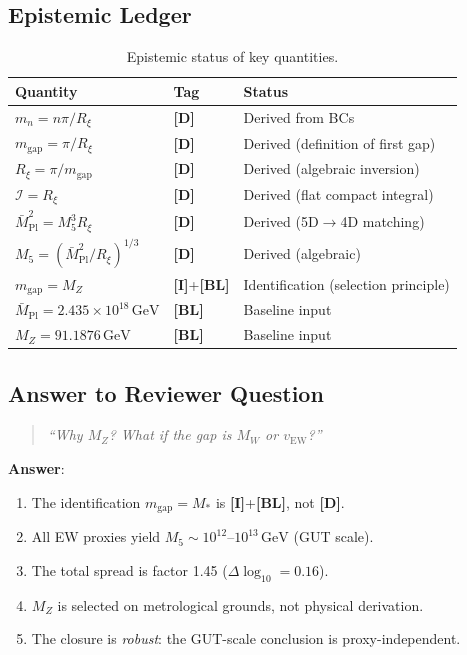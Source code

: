 \documentclass[11pt,a4paper]{article}
\newcommand{\Mpl}{\bar{M}_{\mathrm{Pl}}}
\newcommand{\Mfive}{M_5}
\newcommand{\Rxi}{R_\xi}
\newcommand{\mgap}{m_{\mathrm{gap}}}
\newcommand{\MZ}{M_Z}
\newcommand{\MW}{M_W}
\newcommand{\vEW}{v_{\mathrm{EW}}}
\newcommand{\Mstar}{M_*}
\newcommand{\GeV}{\,\mathrm{GeV}}
\newcommand{\tagD}{\textbf{[D]}}
\newcommand{\tagI}{\textbf{[I]}}
\newcommand{\tagBL}{\textbf{[BL]}}
\theoremstyle{definition}
\theoremstyle{plain}
\theoremstyle{remark}
\begin{document}
\subsection{Epistemic Ledger}

\begin{table}[htbp]
\centering
\caption{Epistemic status of key quantities.}
\label{tab:epistemic}
\begin{tabular}{@{}lll@{}}
\toprule
Quantity & Tag & Status \\
\midrule
$m_n = n\pi/\Rxi$ & \tagD{} & Derived from BCs \\
$\mgap = \pi/\Rxi$ & \tagD{} & Derived (definition of first gap) \\
$\Rxi = \pi/\mgap$ & \tagD{} & Derived (algebraic inversion) \\
$\mathcal{I} = \Rxi$ & \tagD{} & Derived (flat compact integral) \\
$\Mpl^2 = \Mfive^3 \Rxi$ & \tagD{} & Derived (5D$\to$4D matching) \\
$\Mfive = (\Mpl^2/\Rxi)^{1/3}$ & \tagD{} & Derived (algebraic) \\
\midrule
$\mgap = \MZ$ & \tagI{}+\tagBL{} & Identification (selection principle) \\
$\Mpl = 2.435 \times 10^{18}\GeV$ & \tagBL{} & Baseline input \\
$\MZ = 91.1876\GeV$ & \tagBL{} & Baseline input \\
\bottomrule
\end{tabular}
\end{table}

\subsection{Answer to Reviewer Question}

\begin{quote}
\emph{``Why $\MZ$? What if the gap is $\MW$ or $\vEW$?''}
\end{quote}

\textbf{Answer}:
\begin{enumerate}
\item The identification $\mgap = \Mstar$ is \tagI{}+\tagBL{}, not \tagD{}.
\item All EW proxies yield $\Mfive \sim 10^{12}\text{--}10^{13}\GeV$ (GUT scale).
\item The total spread is factor 1.45 ($\Delta\log_{10} = 0.16$).
\item $\MZ$ is selected on metrological grounds, not physical derivation.
\item The closure is \emph{robust}: the GUT-scale conclusion is proxy-independent.
\end{enumerate}
\end{document}
